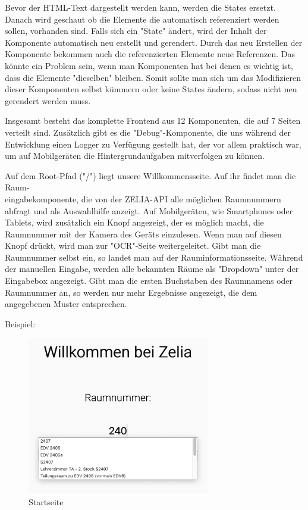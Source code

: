 Bevor der HTML-Text dargestellt werden kann, werden die States ersetzt. Danach wird geschaut ob die Elemente die automatisch referenziert werden sollen, vorhanden sind. Falls sich ein "State" ändert, wird der Inhalt der Komponente automatisch neu erstellt und gerendert. Durch das neu Erstellen der Komponente bekommen auch die referenzierten Elemente neue Referenzen. Das könnte ein Problem sein, wenn man Komponenten hat bei denen es wichtig ist, dass die Elemente "dieselben" bleiben. Somit sollte man sich um das Modifizieren dieser Komponenten selbst kümmern oder keine States ändern, sodass nicht neu gerendert werden muss.


Insgesamt besteht das komplette Frontend aus 12 Komponenten, die auf 7 Seiten verteilt sind. Zusätzlich gibt es die "Debug"-Komponente, die uns während der Entwicklung einen Logger zu Verfügung gestellt hat, der vor allem praktisch war, um auf Mobilgeräten die Hintergrundaufgaben mitverfolgen zu können.

\label{sec:webcompstart}

Auf dem Root-Pfad ("/") liegt unsere Willkommensseite. Auf ihr findet man die Raum-\\eingabekomponente, die von der ZELIA-API alle möglichen Raumnummern abfragt und als Auswahlhilfe anzeigt. Auf Mobilgeräten, wie Smartphones oder Tablets, wird zusätzlich ein Knopf angezeigt, der es möglich macht, die Raumnummer mit der Kamera des Geräts einzulesen. Wenn man auf diesen Knopf drückt, wird man zur "OCR"-Seite weitergeleitet. Gibt man die Raumnummer selbst ein, so landet man auf der Rauminformationsseite. Während der manuellen Eingabe, werden alle bekannten Räume als "Dropdown" unter der Eingabebox angezeigt. Gibt man die ersten Buchstaben des Raumnamens oder Raumnummer an, so werden nur mehr Ergebnisse angezeigt, die dem angegebenen Muster entsprechen.

Beispiel:

\begin{figure}[H]
    \centering
    \includegraphics[width=80mm]{media/WebComponents/Startseite_light.png}
    \caption{Startseite}
    \label{fig:compinput}
\end{figure}


